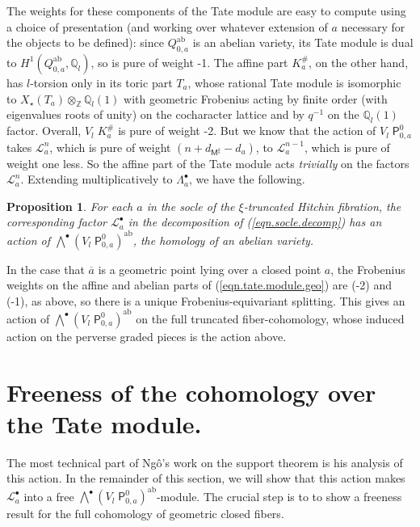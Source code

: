 \documentclass[openany]{amsbook}
\newtheorem{proposition}[theorem]{Proposition}
\theoremstyle{definition}
\theoremstyle{remark}
\numberwithin{equation}{section}
\newcommand{\Q}{\mathbb{Q}}
\newcommand{\Z}{\mathbb{Z}}
\newcommand{\cL}{\mathcal{L}}
\newcommand{\ol}[1]{\overline{#1}}
\renewcommand{\-}{\operatorname{-}}
\newcommand{\bM}{\mathsf{M}}
\newcommand{\bP}{\mathsf{P}}
\newcommand{\ab}{\mathrm{ab}}
\newcommand{\Tate}{V_l \;}
\begin{document}
The weights for these components of the Tate module are easy to compute using a choice of presentation (and working over whatever extension of $a$ necessary for the objects to be defined): since $Q^{\ab}_{0,a}$ is an abelian variety, its Tate module is dual to $H^1(Q_{0,a}^{\ab}, \Q_l)$, so is pure of weight -1. The affine part $K_a^\#$, on the other hand, has $l$-torsion only in its toric part $T_a$, whose rational Tate module is isomorphic to $X_\star(T_a) \otimes_{\Z} \Q_l(1)$ with geometric Frobenius acting by finite order (with eigenvalues roots of unity) on the cocharacter lattice and by $q^{-1}$ on the $\Q_l(1)$ factor. Overall, $\Tate K_a^{\#}$ is pure of weight -2. But we know that the action of $\Tate \bP_{0,a}^0$ takes $\cL_a^n$, which is pure of weight $(n + d_{\bM^{\xi}} - d_a)$, to $\cL_{a}^{n-1}$, which is pure of weight one less. So the affine part of the Tate module acts \textit{trivially} on the factors $\cL_a^n$. Extending multiplicatively to $\Lambda_a^\bullet$, we have the following.

\begin{proposition}\label{prop.tate.action.La}
    For each $a$ in the socle of the $\xi$-truncated Hitchin fibration, the corresponding factor $\cL_a^\bullet$ in the decomposition of (\ref{eqn.socle.decomp}) has an action of $\bigwedge^\bullet (\Tate \bP_{0,a}^0)^{\ab}$, the homology of an abelian variety. 
\end{proposition}

In the case that $\ol{a}$ is a geometric point lying over a closed point $a$, the Frobenius weights on the affine and abelian parts of (\ref{eqn.tate.module.geo}) are (-2) and (-1), as above, so there is a unique Frobenius-equivariant splitting. This gives an action of $\bigwedge^\bullet (\Tate \bP_{0,a}^0)^{\ab}$ on the full truncated fiber-cohomology, whose induced action on the perverse graded pieces is the action above.

\section{Freeness of the cohomology over the Tate module.}

The most technical part of Ng\^{o}'s work on the support theorem is his analysis of this action. In the remainder of this section, we will show that this action makes $\cL_a^\bullet$ into a free $\bigwedge^\bullet (\Tate \bP_{0,a}^0)^{\ab}$-module. The crucial step is to to show a freeness result for the full cohomology of geometric closed fibers. 
\end{document}
